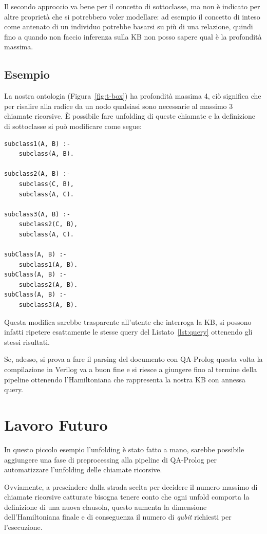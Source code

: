 \documentclass[]{article}
\begin{document}
Il secondo approccio va bene per il concetto di sottoclasse, ma non è indicato per altre proprietà che si potrebbero voler modellare: ad esempio il concetto di \say{} inteso come antenato di un individuo potrebbe basarsi su più di una relazione, quindi fino a quando non faccio inferenza sulla KB non posso sapere qual è la profondità massima.

\subsection{Esempio}
La nostra ontologia (Figura~\ref{fig:t-box}) ha profondità massima 4, ciò significa che per risalire alla radice da un nodo qualsiasi sono necessarie al massimo 3 chiamate ricorsive. È possibile fare unfolding di queste chiamate e la definizione di sottoclasse si può modificare come segue:
\begin{listing}[h]
	\centering
	\begin{minipage}{.5\linewidth}
		\begin{verbatim}
subclass1(A, B) :-
	subclass(A, B).

subclass2(A, B) :-
	subclass(C, B),
	subclass(A, C).

subclass3(A, B) :-
	subclass2(C, B),
	subclass(A, C).

subClass(A, B) :- 
	subclass1(A, B).
subClass(A, B) :- 
	subclass2(A, B).
subClass(A, B) :- 
	subclass3(A, B).
		\end{verbatim}
	\end{minipage}
	\caption{subClass unfolding}
\end{listing}

Questa modifica sarebbe trasparente all'utente che interroga la KB, si possono infatti ripetere esattamente le stesse query del Listato~\ref{lst:query} ottenendo gli stessi risultati. 

Se, adesso, si prova a fare il parsing del documento con QA-Prolog questa volta la compilazione in Verilog va a buon fine e si riesce a giungere fino al termine della pipeline ottenendo l'Hamiltoniana che rappresenta la nostra KB con annessa query.

\section{Lavoro Futuro}
In questo piccolo esempio l'unfolding è stato fatto a mano, sarebbe possibile aggiungere una fase di preprocessing alla pipeline di QA-Prolog per automatizzare l'unfolding delle chiamate ricorsive. 

Ovviamente, a prescindere dalla strada scelta per decidere il numero massimo di chiamate ricorsive catturate bisogna tenere conto che ogni unfold comporta la definizione di una nuova clausola, questo aumenta la dimensione dell'Hamiltoniana finale e di conseguenza il numero di \emph{qubit} richiesti per l'esecuzione.
\end{document}
